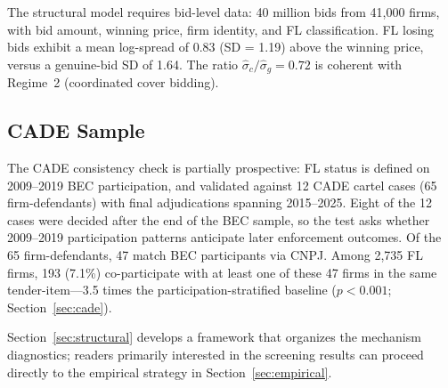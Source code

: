 The structural model requires bid-level data: 40 million bids from
41,000 firms, with bid amount, winning price, firm identity, and FL
classification. FL losing bids exhibit a mean log-spread of 0.83
(SD = 1.19) above the winning price, versus a genuine-bid SD of 1.64.
The ratio $\hat{\sigma}_c / \hat{\sigma}_g = 0.72$ is coherent with Regime~2
(coordinated cover bidding).

\subsection{CADE Sample}
\label{sec:cade_sample}

The CADE consistency check is partially prospective: FL status is
defined on 2009--2019 BEC participation, and validated against 12
CADE cartel cases (65 firm-defendants) with final adjudications
spanning 2015--2025. Eight of the 12 cases were decided after the
end of the BEC sample, so the test asks whether 2009--2019
participation patterns anticipate later enforcement outcomes. Of
the 65 firm-defendants, 47 match BEC participants via CNPJ. Among
2,735 FL firms, 193 (7.1\%) co-participate with at least one of
these 47 firms in the same tender-item---3.5 times the
participation-stratified baseline ($p < 0.001$;
Section~\ref{sec:cade}).

Section~\ref{sec:structural} develops a framework that organizes
the mechanism diagnostics; readers primarily interested in the
screening results can proceed directly to the empirical strategy in
Section~\ref{sec:empirical}.
